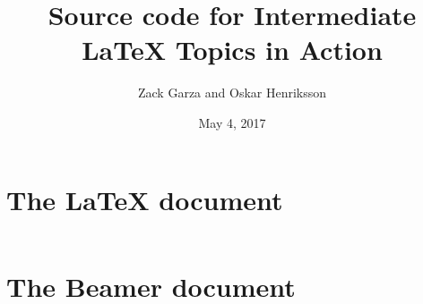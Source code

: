 \documentclass[11pt,letterpaper]{article}
\title{Source code for Intermediate {\LaTeX} Topics in Action}
\author{Zack Garza and Oskar Henriksson}
\date{May 4, 2017}
\begin{document}
\maketitle

\section*{The {\LaTeX} document}
\inputminted[linenos,tabsize=2,breaklines]{LaTeX}{main.tex}

\section*{The Beamer document}
\inputminted[linenos,tabsize=2,breaklines]{LaTeX}{beamer_presentation.tex}
\end{document}

